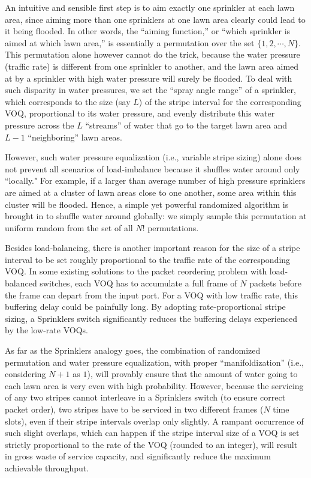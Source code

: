 An intuitive and sensible first step is to aim exactly one sprinkler at each lawn area,
since aiming more than one sprinklers at one lawn area
clearly could lead to it being flooded.
In other words, the ``aiming function,'' or ``which sprinkler is aimed at which lawn area,'' 
is essentially a permutation over the set $\{1, 2, \cdots, N\}$.
This permutation alone however cannot do the trick, because the water pressure (traffic rate) is 
different from one sprinkler to another, and the lawn area aimed at by a sprinkler with high water 
pressure will surely be flooded.
To deal with such disparity in water pressures, we 
set the ``spray angle range'' of a sprinkler, which corresponds to the size (say $L$) of the stripe interval for the
corresponding VOQ, proportional to its water pressure, and evenly distribute this water pressure 
across the 
$L$ ``streams'' of water that go to the target lawn area and $L-1$ ``neighboring'' lawn areas.


However, such water pressure equalization (i.e., variable stripe sizing) alone does not prevent all scenarios of load-imbalance 
because it shuffles water around only ``locally."
For example, if a larger than average 
number of high pressure sprinklers are aimed at a cluster of lawn areas close to one another, some area within 
this cluster will be flooded.   Hence, 
a simple yet powerful randomized algorithm is brought in 
to shuffle water around globally: we simply sample this permutation 
at uniform random
from the set of all $N!$ permutations.





Besides load-balancing, there is another important reason for the size of a stripe interval to be set roughly 
proportional to the traffic rate of the corresponding VOQ.  In 
some existing solutions to the packet reordering
problem with load-balanced switches, each VOQ has to accumulate a full frame of $N$ packets before the frame can depart from the 
input port.  For a VOQ with low traffic rate, this buffering delay could be painfully long.  By adopting
rate-proportional
stripe sizing, a Sprinklers switch significantly reduces the buffering delays experienced by the low-rate VOQs.

As far as the Sprinklers analogy goes, the combination of randomized permutation and water pressure equalization,
with proper ``manifoldization'' (i.e., considering $N + 1$ as $1$),
will provably ensure that the amount of water going to each lawn area is very even with high 
probability.   However, because the servicing of any two stripes cannot interleave in a Sprinklers switch (to ensure correct
packet order), two stripes have to be serviced in two different frames ($N$ time slots),
even if their stripe intervals overlap only slightly.  
A rampant occurrence of such slight overlaps, which can happen if the stripe interval size of a VOQ is set strictly proportional
to the rate of the VOQ (rounded to an integer), 
will result in gross waste of service capacity, and significantly reduce the maximum achievable throughput.


